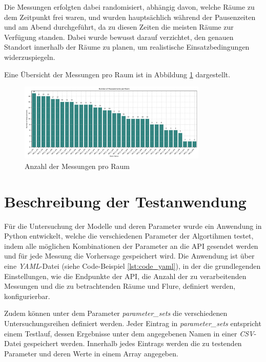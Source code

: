 Die Messungen erfolgten dabei randomisiert, abhängig davon, welche Räume zu dem Zeitpunkt frei waren, und wurden hauptsächlich während der Pausenzeiten und am Abend durchgeführt, da zu diesen Zeiten die meisten Räume zur Verfügung standen. Dabei wurde bewusst darauf verzichtet, den genauen Standort innerhalb der Räume zu planen, um realistische Einsatzbedingungen widerzuspiegeln.

Eine Übersicht der Messungen pro Raum ist in Abbildung \ref{fig:0_general_01} dargestellt.

\begin{figure}[H]
    \centering
    \includegraphics[width=0.8\textwidth]{images/00_general_01.png}
    \caption{Anzahl der Messungen pro Raum}
    \label{fig:0_general_01}
\end{figure}

\section{Beschreibung der Testanwendung} \label{testanwendung}

Für die Untersuchung der Modelle und deren Parameter wurde ein Anwendung in Python entwickelt, welche die verschiedenen Parameter der Algortihmen testet, indem alle möglichen Kombinationen der Parameter an die API gesendet werden und für jede Messung die Vorhersage gespeichert wird. Die Anwendung ist über eine \textit{YAML}-Datei (siehe Code-Beispiel \ref{lst:code_yaml}), in der die grundlegenden Einstellungen, wie die Endpunkte der API, die Anzahl der zu verarbeitenden Messungen und die zu betrachtenden Räume und Flure, definiert werden, konfigurierbar. 

Zudem können unter dem Parameter \textit{parameter\_sets} die verschiedenen Untersuchungsreihen definiert werden. Jeder Eintrag in \textit{parameter\_sets} entspricht einem Testlauf, dessen Ergebnisse unter dem angegebenen Namen in einer \textit{CSV}-Datei gespeichert werden. Innerhalb jedes Eintrags werden die zu testenden Parameter und deren Werte in einem Array angegeben.

